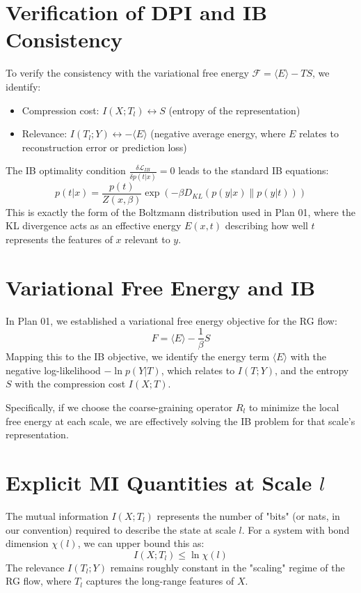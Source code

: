 \documentclass{article}
\begin{document}
\section{Verification of DPI and IB Consistency}
To verify the consistency with the variational free energy $\mathcal{F} = \langle E \rangle - T S$, we identify:
\begin{itemize}
    \item Compression cost: $I(X; T_l) \longleftrightarrow S$ (entropy of the representation)
    \item Relevance: $I(T_l; Y) \longleftrightarrow -\langle E \rangle$ (negative average energy, where $E$ relates to reconstruction error or prediction loss)
\end{itemize}
The IB optimality condition $\frac{\delta \mathcal{L}_{IB}}{\delta p(t|x)} = 0$ leads to the standard IB equations:
\begin{equation}
    p(t|x) = \frac{p(t)}{Z(x, \beta)} \exp\left( -\beta D_{KL}(p(y|x) \| p(y|t)) \right)
\end{equation}
This is exactly the form of the Boltzmann distribution used in Plan 01, where the KL divergence acts as an effective energy $E(x, t)$ describing how well $t$ represents the features of $x$ relevant to $y$.

\section{Variational Free Energy and IB}
In Plan 01, we established a variational free energy objective for the RG flow:
\begin{equation}
    F = \langle E \rangle - \frac{1}{\beta} S
\end{equation}
Mapping this to the IB objective, we identify the energy term $\langle E \rangle$ with the negative log-likelihood $-\ln p(Y|T)$, which relates to $I(T; Y)$, and the entropy $S$ with the compression cost $I(X; T)$.

Specifically, if we choose the coarse-graining operator $R_l$ to minimize the local free energy at each scale, we are effectively solving the IB problem for that scale's representation.

\section{Explicit MI Quantities at Scale $l$}
The mutual information $I(X; T_l)$ represents the number of "bits" (or nats, in our convention) required to describe the state at scale $l$. For a system with bond dimension $\chi(l)$, we can upper bound this as:
\begin{equation}
    I(X; T_l) \leq \ln \chi(l)
\end{equation}
The relevance $I(T_l; Y)$ remains roughly constant in the "scaling" regime of the RG flow, where $T_l$ captures the long-range features of $X$.
\end{document}
